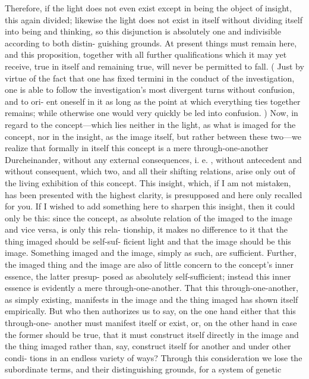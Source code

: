  Therefore, if the light does not
even exist except in being the object of insight, this again divided; likewise the
light does not exist in itself without dividing itself into being and thinking, so
this disjunction is absolutely one and indivisible according to both distin-
guishing grounds.
 At present things must remain here, and this proposition,
together with all further qualifications which it may yet receive, true in itself
and remaining true, will never be permitted to fall.
 ( Just by virtue of the fact
that one has fixed termini in the conduct of the investigation, one is able to
follow the investigation’s most divergent turns without confusion, and to ori-
ent oneself in it as long as the point at which everything ties together remains;
while otherwise one would very quickly be led into confusion.
)
Now, in regard to the concept—which lies neither in the light, as what
is imaged for the concept, nor in the insight, as the image itself, but rather
between these two—we realize that formally in itself this concept is a mere
through-one-another {Durcheinander}, without any external consequences, i.
e.
,
without antecedent and without consequent, which two, and all their shifting
relations, arise only out of the living exhibition of this concept.
 This insight,
which, if I am not mistaken, has been presented with the highest clarity, is
presupposed and here only recalled for you.
 If I wished to add something here
to sharpen this insight, then it could only be this: since the concept, as
absolute relation of the imaged to the image and vice versa, is only this rela-
tionship, it makes no difference to it that the thing imaged should be self-suf-
ficient light and that the image should be this image.
 Something imaged and
the image, simply as such, are sufficient.
 Further, the imaged thing and the
image are also of little concern to the concept’s inner essence, the latter presup-
posed as absolutely self-sufficient; instead this inner essence is evidently a
mere through-one-another.
 That this through-one-another, as simply existing,
manifests in the image and the thing imaged has shown itself empirically.
 But
who then authorizes us to say, on the one hand either that this through-one-
another must manifest itself or exist, or, on the other hand in case the former
should be true, that it must construct itself directly in the image and the thing
imaged rather than, say, construct itself for another and under other condi-
tions in an endless variety of ways? Through this consideration we lose the
subordinate terms, and their distinguishing grounds, for a system of genetic
